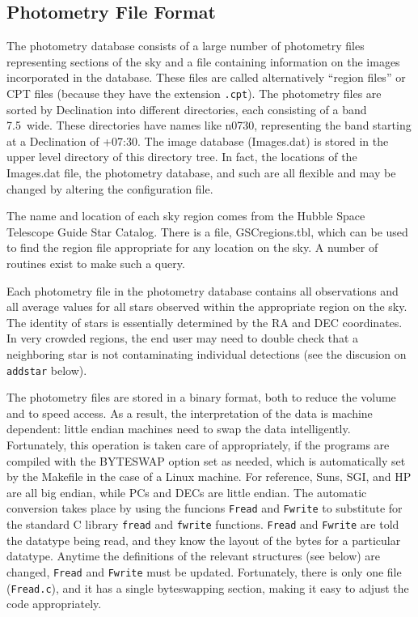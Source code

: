 \documentclass{article}
\begin{document}
\subsection{Photometry File Format}
The photometry database consists of a large number of photometry files
representing sections of the sky and a file containing information on
the images incorporated in the database.  These files are called
alternatively ``region files'' or CPT files (because they have the
extension {\tt .cpt}).  The photometry files are sorted by Declination
into different directories, each consisting of a band 7.5\degree\ 
wide.  These directories have names like n0730, representing the band
starting at a Declination of +07:30.  The image database (Images.dat)
is stored in the upper level directory of this directory tree.  In
fact, the locations of the Images.dat file, the photometry database,
and such are all flexible and may be changed by altering the
configuration file.

The name and location of each sky region comes from the Hubble Space
Telescope Guide Star Catalog.  There is a file, GSCregions.tbl, which
can be used to find the region file appropriate for any location on
the sky.  A number of routines exist to make such a query.  

Each photometry file in the photometry database contains all
observations and all average values for all stars observed within the
appropriate region on the sky.  The identity of stars is essentially
determined by the RA and DEC coordinates.  In very crowded regions,
the end user may need to double check that a neighboring star is not
contaminating individual detections (see the discusion on {\tt
  addstar} below).

The photometry files are stored in a binary format, both to reduce the
volume and to speed access.  As a result, the interpretation of the
data is machine dependent: little endian machines need to swap the
data intelligently.  Fortunately, this operation is taken care of
appropriately, if the programs are compiled with the BYTESWAP option
set as needed, which is automatically set by the Makefile in the case
of a Linux machine.  For reference, Suns, SGI, and HP are all big
endian, while PCs and DECs are little endian.  The automatic
conversion takes place by using the funcions {\tt Fread} and {\tt Fwrite}
to substitute for the standard C library {\tt fread} and {\tt fwrite}
functions.  {\tt Fread} and {\tt Fwrite} are told the datatype being read,
and they know the layout of the bytes for a particular datatype.
Anytime the definitions of the relevant structures (see below) are
changed, {\tt Fread} and {\tt Fwrite} must be updated.  Fortunately, there
is only one file ({\tt Fread.c}), and it has a single byteswapping
section, making it easy to adjust the code appropriately.
\end{document}
